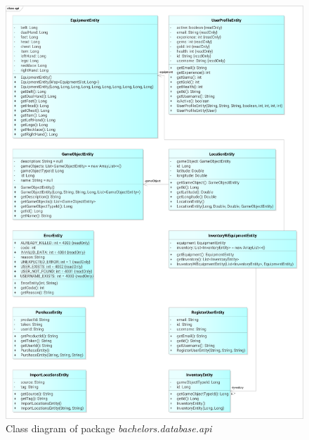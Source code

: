 \begin{figure}[h]	
	\includegraphics[width=\textwidth]{figures/classdiagrams/dsapi}
	\centering			
	\caption{Class diagram of package \textit{bachelors.database.api}}
\end{figure}


